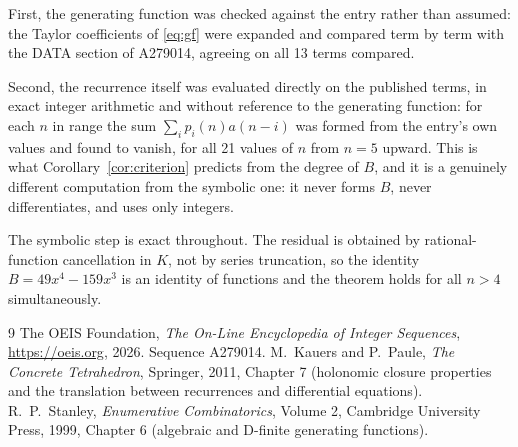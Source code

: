 \documentclass[11pt,a4paper]{article}
\theoremstyle{plain}
\theoremstyle{definition}
\begin{document}
First, the generating function was checked against the entry rather than assumed: the
Taylor coefficients of \eqref{eq:gf} were expanded and compared term by term with the DATA
section of A279014, agreeing on all 13 terms compared.

Second, the recurrence itself was evaluated directly on the published terms, in exact
integer arithmetic and without reference to the generating function: for each $n$ in range
the sum $\sum_{i}p_{i}(n)a(n-i)$ was formed from the entry's own values and found to
vanish, for all 21 values of $n$ from $n=5$ upward. This is what
Corollary~\ref{cor:criterion} predicts from the degree of $B$, and it is a genuinely
different computation from the symbolic one: it never forms $B$, never differentiates, and
uses only integers.

The symbolic step is exact throughout. The residual is obtained by rational-function
cancellation in $K$, not by series truncation, so the identity $B=49 x^{4} - 159 x^{3}$ is an
identity of functions and the theorem holds for all $n>4$ simultaneously.

\begin{thebibliography}{9}
 The OEIS Foundation, \emph{The On-Line Encyclopedia of Integer Sequences},
\url{https://oeis.org}, 2026. Sequence A279014.
 M.~Kauers and P.~Paule, \emph{The Concrete Tetrahedron}, Springer, 2011,
Chapter 7 (holonomic closure properties and the translation between recurrences and
differential equations).
 R.~P.~Stanley, \emph{Enumerative Combinatorics}, Volume 2, Cambridge
University Press, 1999, Chapter 6 (algebraic and D-finite generating functions).
\end{thebibliography}
\end{document}
